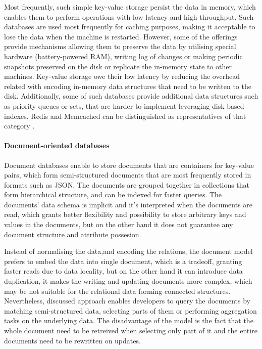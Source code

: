 Most frequently, such simple key-value storage persist the data in memory, which enables them to perform operations with low latency and high throughput. Such databases are used most frequently for caching purposes, making it acceptable to lose the data when the machine is restarted. However, some of the offerings provide mechanisms allowing them to preserve the data by utilising special hardware (battery-powered RAM), writing log of changes or making periodic snapshots preserved on the disk or replicate the in-memory state to other machines. Key-value storage owe their low latency by reducing the overhead related with encoding in-memory data structures that need to be written to the disk. Additionally, some of such databases provide additional data structures such as priority queues or sets, that are harder to implement leveraging disk based indexes. Redis and Memcached can be distinguished as representatives of that category \cite{DesignDataIntensiveApplications}. 

\paragraph*{Document-oriented databases}

Document databases enable to store documents that are containers for key-value pairs, which form semi-structured documents that are most frequently stored in formats such as JSON. The documents are grouped together in collections that form hierarchical structure, and can be indexed for faster queries. The documents' data schema is implicit and it's interpreted when the documents are read, which grants better flexibility and possibility to store arbitrary keys and values in the documents, but on the other hand it does not guarantee any document structure and attribute possesion.

Instead of normalising the data,and encoding the relations, the document model prefers to embed the data into single document, which is a tradeoff, granting faster reads due to data locality, but on the other hand it can introduce data duplication, it makes the writing and updating documents more complex, which may be not suitable for the relational data forming connected structures. Nevertheless, discussed approach enables developers to query the documents by matching semi-structured data, selecting parts of them or performing aggregation tasks on the underlying data. 
The disadvantage of the model is the fact that the whole document need to be retreived when selecting only part of it and the entire documents need to be rewritten on updates.

